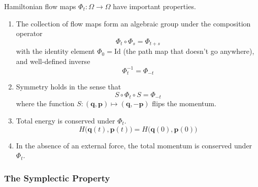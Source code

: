 \documentclass{article}
\begin{document}
    Hamiltonian flow maps $\Phi_t : \Omega \longrightarrow \Omega$ have important properties. 
    \begin{enumerate}
        \item The collection of flow maps form an algebraic group under the composition operator
        \begin{equation}
          \Phi_t \circ \Phi_s = \Phi_{t + s}
        \end{equation}
        with the identity element $\Phi_0 = \mathrm{Id}$ (the path map that doesn't go anywhere), and well-defined inverse 
        \begin{equation}
          \Phi_t^{-1} = \Phi_{-t}
        \end{equation}
        \item Symmetry holds in the sense that 
        \begin{equation}
          S \circ \Phi_t \circ S = \Phi_{-t}
        \end{equation}
        where the function $S: (\mathbf{q}, \mathbf{p}) \mapsto (\mathbf{q}, -\mathbf{p})$ flips the momentum. 
        \item Total energy is conserved under $\Phi_t$. 
        \begin{equation}
          H\big( \mathbf{q}(t), \mathbf{p}(t) \big) = H\big( \mathbf{q}(0), \mathbf{p}(0) \big)
        \end{equation}
        \item In the absence of an external force, the total momentum is conserved under $\Phi_t$. 
    \end{enumerate}

    \subsubsection{The Symplectic Property}
\end{document}
